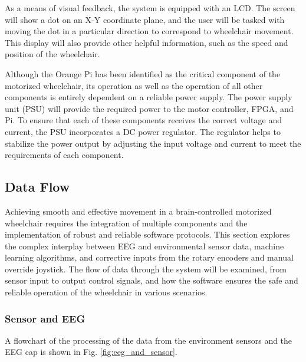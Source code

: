 \documentclass[conference]{IEEEtran}
\begin{document}
    As a means of visual feedback, the system is equipped with an LCD. The screen will show a dot on an X-Y coordinate plane, and the user will be tasked with moving the dot in a particular direction to correspond to wheelchair movement.  {This display will also provide other helpful information,} such as the speed and position of the wheelchair. 

    Although the Orange Pi has been identified as the critical component of the motorized wheelchair, its operation as well as the operation of all other components is entirely dependent on a reliable power supply. The power supply unit (PSU) will provide the required power to the motor controller, FPGA, and Pi. To ensure that each of these components receives the correct voltage and current, the PSU incorporates a DC power regulator. The regulator helps to stabilize the power output by adjusting the input voltage and current to meet the requirements of each component. 
    
    \subsection{Data Flow}

    Achieving smooth and effective movement in a brain-controlled motorized wheelchair requires the integration of multiple components and the implementation of robust and reliable software protocols. This section explores the complex interplay between EEG and environmental sensor data, machine learning algorithms, and corrective inputs from the rotary encoders and manual override joystick. The flow of data through the system will be examined, from sensor input to output control signals, and how the software ensures the safe and reliable operation of the wheelchair in various scenarios.
    
        \subsubsection{Sensor and EEG}

        A flowchart of the processing of the data from the environment sensors and the EEG cap is shown in Fig. \ref{fig:eeg_and_sensor}. 
        
\end{document}
